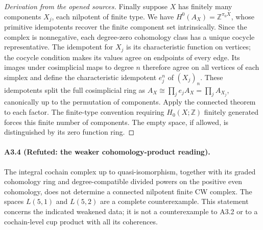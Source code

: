 \begin{proof}[Derivation from the opened sources]
Finally suppose $X$ has finitely many components $X_j$, each nilpotent
of finite type. We have
$H^0(A_X)=\mathbb Z^{\pi_0X}$, whose primitive idempotents recover
the finite component set intrinsically. Since the complex is
nonnegative, each degree-zero cohomology class has a unique cocycle
representative. The idempotent for $X_j$ is its characteristic
function on vertices; the cocycle condition makes its values agree
on endpoints of every edge. Its images under cosimplicial maps to
degree $n$ therefore agree on all vertices of each simplex and define
the characteristic idempotent $e_j^n$ of $(X_j)_n$.
These idempotents split the full cosimplicial ring as
$A_X\cong\prod_j e_jA_X=\prod_j A_{X_j}$, canonically up to the
permutation of components. Apply the connected theorem to each factor.
The finite-type convention requiring $H_0(X;\mathbb Z)$ finitely
generated forces this finite number of components. The empty space,
if allowed, is distinguished by its zero function ring.
\end{proof}

\paragraph{A3.4 (Refuted: the weaker cohomology-product reading).}
\label{A3.4}
The integral cochain complex up to quasi-isomorphism, together with its
graded cohomology ring and degree-compatible divided powers on the
positive even cohomology, does not determine a connected nilpotent
finite CW complex. The spaces $L(5,1)$ and $L(5,2)$ are a complete
counterexample. This statement concerns the indicated weakened data;
it is not a counterexample to A3.2 or to a cochain-level cup product
with all its coherences.

